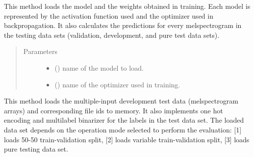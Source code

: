 \documentclass[letterpaper,10pt,english]{sphinxmanual}
\begin{document}
\begin{fulllineitems}

\begin{fulllineitems}
\label{\detokenize{evaluate:evaluate.Evaluator.load_model}}
This method loads the model and the weights obtained in training.
Each model is represented by the activation function used and the optimizer 
used in backpropagation. It also calculates the predictions for every
melspectrogram in the testing data sets (validation, development, and pure test data sets).
\begin{quote}\begin{description}
\item[{Parameters}] \leavevmode\begin{itemize}
\item {} 
 () \textendash{} name of the model to load.

\item {} 
 () \textendash{} name of the optimizer used in training.

\end{itemize}

\end{description}\end{quote}

\end{fulllineitems}


\begin{fulllineitems}
\label{\detokenize{evaluate:evaluate.Evaluator.load_multi_test_data}}
This method loads the multiple-input development test data (melspectrogram arrays) and 
corresponding file ids to memory. It also implements one hot encoding 
and multilabel binarizer for the labels in the test data set. The loaded data set
depends on the operation mode selected to perform the evaluation: {[}1{]} loads 50-50
train-validation split, {[}2{]} loads variable train-validation split, {[}3{]} loads pure 
testing data set.

\end{fulllineitems}



\end{fulllineitems}
\end{document}
